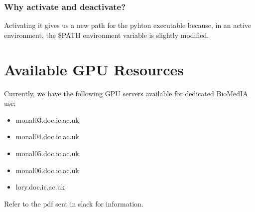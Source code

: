 \documentclass[11pt]{article}
\begin{document}
\subsubsection{Why activate and deactivate?}

Activating it gives us a new path for the pyhton executable because, in an active environment, the \$PATH environment variable is slightly modified.

\section{Available GPU Resources}

Currently, we have the following GPU servers available for dedicated BioMedIA use:

\begin{itemize}
    \item monal03.doc.ic.ac.uk
    \item monal04.doc.ic.ac.uk
    \item monal05.doc.ic.ac.uk
    \item monal06.doc.ic.ac.uk
    \item lory.doc.ic.ac.uk
\end{itemize}

Refer to the pdf sent in slack for information.
\end{document}
